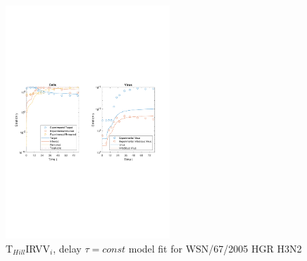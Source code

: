 \begin{figure}[H]
\begin{center}
\includegraphics[width=0.55\textwidth, trim={1cm 9.8cm 1cm 9.5cm}, clip]{D_chapters/6_appendix/4_ValidationH3N2/InfectionDepletionModelTHillIRVViDelayFitTauMOI0.002log.pdf}
\caption[T$_{Hill}$IRVV$_i$, delay $\tau = const$ model fit for WSN/67/2005 HGR H3N2]%
{T$_{Hill}$IRVV$_i$, delay $\tau = const$ model fit for WSN/67/2005 HGR H3N2}
\label{figure:THillIRVViDelayFitTauValidationH3N2}
\end{center}
\end{figure}